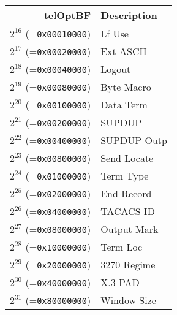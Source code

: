 \documentclass[documentation]{subfiles}
\begin{document}
\begin{minipage}{0.49\textwidth}
    \begin{longtable}{rl}
        \toprule
        {\bf telOptBF} & {\bf Description} \\
        \midrule\endhead%
        $2^{16}$ (={\tt 0x00010000}) & Lf Use\\
        $2^{17}$ (={\tt 0x00020000}) & Ext ASCII\\
        $2^{18}$ (={\tt 0x00040000}) & Logout\\
        $2^{19}$ (={\tt 0x00080000}) & Byte Macro\\
        $2^{20}$ (={\tt 0x00100000}) & Data Term\\
        $2^{21}$ (={\tt 0x00200000}) & SUPDUP\\
        $2^{22}$ (={\tt 0x00400000}) & SUPDUP Outp\\
        $2^{23}$ (={\tt 0x00800000}) & Send Locate\\
        $2^{24}$ (={\tt 0x01000000}) & Term Type\\
        $2^{25}$ (={\tt 0x02000000}) & End Record\\
        $2^{26}$ (={\tt 0x04000000}) & TACACS ID\\
        $2^{27}$ (={\tt 0x08000000}) & Output Mark\\
        $2^{28}$ (={\tt 0x10000000}) & Term Loc\\
        $2^{29}$ (={\tt 0x20000000}) & 3270 Regime\\
        $2^{30}$ (={\tt 0x40000000}) & X.3 PAD\\
        $2^{31}$ (={\tt 0x80000000}) & Window Size\\
        \bottomrule
    \end{longtable}
\end{minipage}
\end{document}
